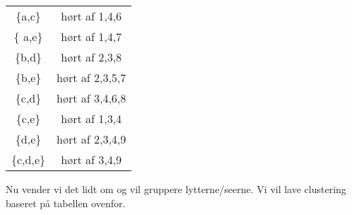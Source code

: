 \documentclass[a4paper, 12pt]{article}
\theoremstyle{remark}
\begin{document}
\begin{center}
\begin{tabular}{cc}
\{a,c\} & hørt af 1,4,6 \\
\{ a,e\}& hørt af 1,4,7\\
\{b,d\}& hørt af 2,3,8 \\
\{b,e\}& hørt af  2,3,5,7\\
\{c,d\}& hørt af 3,4,6,8\\
\{c,e\}& hørt af 1,3,4\\
\{d,e\}& hørt af 2,3,4,9\\


\{c,d,e\} & hørt af 3,4,9 \\
\end{tabular}
\end{center}



Nu vender vi det lidt om og vil gruppere lytterne/seerne. Vi vil lave clustering baseret på tabellen ovenfor. 
\end{document}
